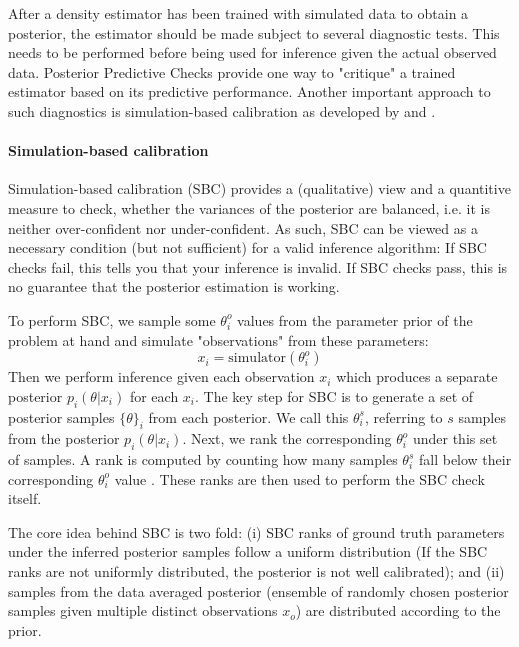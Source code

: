 \documentclass{aa}
\begin{document}
\begin{appendix}
After a density estimator has been trained with simulated data to obtain a posterior, the estimator should be made subject to several diagnostic tests. This needs to be performed before being used for inference given the actual observed data. Posterior Predictive Checks provide one way to "critique" a trained estimator based on its predictive performance. Another important approach to such diagnostics is simulation-based calibration as developed by \citet{Cook2006} and \citet{Talts2018}. 

\paragraph{Simulation-based calibration}
Simulation-based calibration (SBC) provides a (qualitative) view and a quantitive measure to check, whether the variances of the posterior are balanced, i.e. it is neither over-confident nor under-confident. As such, SBC can be viewed as a necessary condition (but not sufficient) for a valid inference algorithm: If SBC checks fail, this tells you that your inference is invalid. If SBC checks pass, this is no guarantee that the posterior estimation is working.

To perform SBC, we sample some $\theta_i^o$ values from the parameter prior of the problem at hand and simulate "observations" from these parameters: 
\begin{equation}
    x_i = \text{simulator}(\theta_i^o)
\end{equation}
Then we perform inference given each observation $x_i$ which produces a separate posterior $p_i(\theta|x_i)$ for each $x_i$. The key step for SBC is to generate a set of posterior samples $\{\theta\}_i$ from each posterior. We call this $\theta_i^s$, referring to $s$ samples from the posterior $p_i(\theta|x_i)$. Next, we rank the corresponding $\theta_i^o$ under this set of samples. A rank is computed by counting how many samples $\theta_i^s$ fall below their corresponding $\theta_i^o$ value \citep[see section 4.1 in][]{Talts2018}. These ranks are then used to perform the SBC check itself.

The core idea behind SBC is two fold: (i) SBC ranks of ground truth parameters under the inferred posterior samples follow a uniform distribution (If the SBC ranks are not uniformly distributed, the posterior is not well calibrated); and (ii) samples from the data averaged posterior (ensemble of randomly chosen posterior samples given multiple distinct observations $x_o$) are distributed according to the prior.


\end{appendix}
\end{document}
